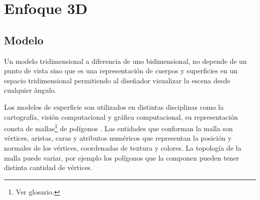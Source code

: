\section{Enfoque 3D}
\subsection{Modelo}
Un modelo tridimensional a diferencia de uno bidimensional, no depende de un punto de vista sino que es una representación de cuerpos y superficies en un espacio tridimensional permitiendo al diseñador visualizar la escena desde cualquier ángulo.

Los modelos de superficie son utilizados en distintas disciplinas como la cartografía, visión computacional y gráfica computacional, su representación consta de mallas\footnote{Ver glosario.} de polígonos \cite{Mesh_building}.
Las entidades que conforman la malla son vértices, aristas, caras y atributos numéricos que representan la posición y normales de los vértices, coordenadas de textura y colores. La topología de la malla puede variar, por ejemplo los polígonos que la componen pueden tener distinta cantidad de vértices.

